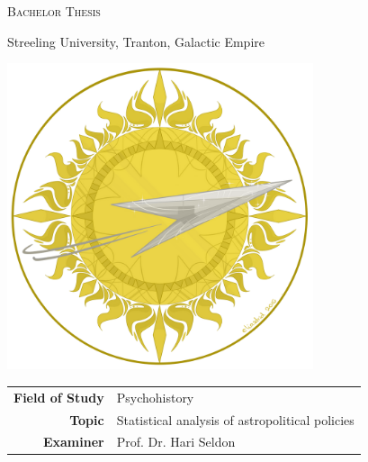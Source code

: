 
\begin{titlepage}
  \centering

  {\huge\bfseries\sffamily \thetitle \par}
  \vspace{1cm}

  {\large\slshape \theauthor \par}
  \vspace{1cm}

  {\scshape Bachelor Thesis \par}
  {Streeling University, Tranton, Galactic Empire\par}
  {\thedate\par}

  \vfill
  \includegraphics[height = 9cm]{figures/galactic-empire}
  \nocite{eliasdrid-galactic} %
  \vfill

  \begin{tabular}{rl}
    \bfseries\sffamily Field of Study & Psychohistory \\
    \bfseries\sffamily Topic          & Statistical analysis of astropolitical policies \\
    \bfseries\sffamily Examiner       & Prof. Dr. Hari Seldon \\
  \end{tabular}
  \restoregeometry
\end{titlepage}
